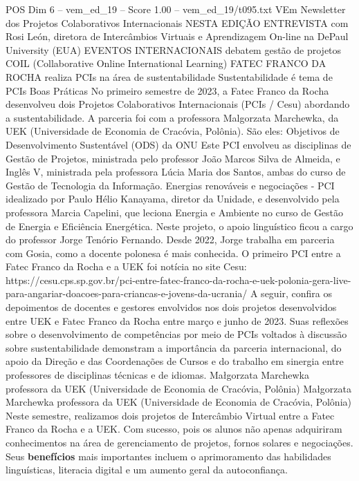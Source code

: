 \begin{textsample}{POS Dim 6 – vem\_ed\_19 – Score 1.00 – vem\_ed\_19/t095.txt}  \label{ex:f6_pos_113}
VEm Newsletter dos Projetos Colaborativos Internacionais NESTA EDIÇÃO ENTREVISTA com Rosi León, diretora de Intercâmbios Virtuais e Aprendizagem On-line na DePaul University (EUA) EVENTOS INTERNACIONAIS debatem gestão de projetos COIL (Collaborative Online International Learning) FATEC FRANCO DA ROCHA realiza PCIs na área de sustentabilidade Sustentabilidade é tema de PCIs Boas Práticas No primeiro semestre de 2023, a Fatec Franco da Rocha desenvolveu dois Projetos Colaborativos Internacionais (PCIs / Cesu) abordando a sustentabilidade.
A parceria foi com a professora Malgorzata Marchewka, da UEK (Universidade de Economia de Cracóvia, Polônia).
São eles: Objetivos de Desenvolvimento Sustentável (ODS) da ONU Este PCI envolveu as disciplinas de Gestão de Projetos, ministrada pelo professor João Marcos Silva de Almeida, e Inglês V, ministrada pela professora Lúcia Maria dos Santos, ambas do curso de Gestão de Tecnologia da Informação.
Energias renováveis e negociações - PCI idealizado por Paulo Hélio Kanayama, diretor da Unidade, e desenvolvido pela professora Marcia Capelini, que leciona Energia e Ambiente no curso de Gestão de Energia e Eficiência Energética.
Neste projeto, o apoio linguístico ficou a cargo do professor Jorge Tenório Fernando.
Desde 2022, Jorge trabalha em parceria com Gosia, como a docente polonesa é mais conhecida.
O primeiro PCI entre a Fatec Franco da Rocha e a UEK foi notícia no site Cesu: https://cesu.cps.sp.gov.br/pci-entre-fatec-franco-da-rocha-e-uek-polonia-gera-live-para-angariar-doacoes-para-criancas-e-jovens-da-ucrania/ A seguir, confira os depoimentos de docentes e gestores envolvidos nos dois projetos desenvolvidos entre UEK e Fatec Franco da Rocha entre março e junho de 2023.
Suas reflexões sobre o desenvolvimento de competências por meio de PCIs voltados à discussão sobre sustentabilidade demonstram a importância da parceria internacional, do apoio da Direção e das Coordenações de Cursos e do trabalho em sinergia entre professores de disciplinas técnicas e de idiomas.
Małgorzata Marchewka professora da UEK (Universidade de Economia de Cracóvia, Polônia) Małgorzata Marchewka professora da UEK (Universidade de Economia de Cracóvia, Polônia) Neste semestre, realizamos dois projetos de Intercâmbio Virtual entre a Fatec Franco da Rocha e a UEK.
Com sucesso, pois os alunos não apenas adquiriram conhecimentos na área de gerenciamento de projetos, fornos solares e negociações.
Seus \textbf{benefícios} mais importantes incluem o aprimoramento das habilidades linguísticas, literacia digital e um aumento geral da autoconfiança.

\end{textsample}
